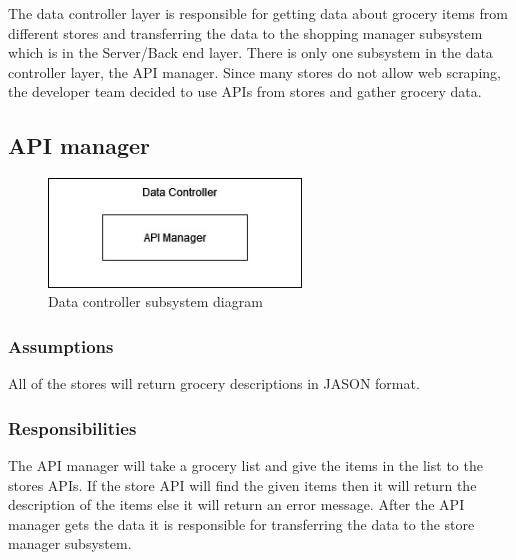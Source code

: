 The data controller layer is responsible for getting data about grocery items from different stores and transferring the data to the shopping manager subsystem which is in the Server/Back end layer. There is only one subsystem in the data controller layer, the API manager. Since many stores do not allow web scraping, the developer team decided to use APIs from stores and gather grocery data.
\subsection{API manager}

\begin{figure}[h!]
	\centering
 	\includegraphics[width=0.60\textwidth]{images/data_controller.jpg}
 \caption{Data controller subsystem diagram}
\end{figure}

\subsubsection{Assumptions}
All of the stores will return grocery descriptions in JASON format. 
\subsubsection{Responsibilities}
The API manager will take a grocery list and give the items in the list to the stores APIs. If the store API will find the given items then it will return the description of the items else it will return an error message. After the API manager gets the data it is responsible for transferring the data to the store manager subsystem. 
